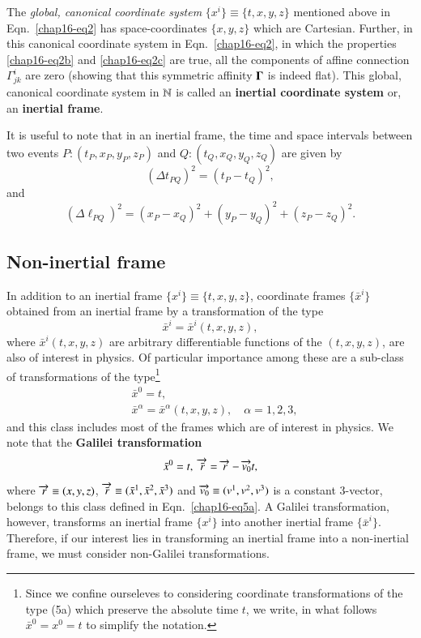 The \textsl{global, canonical coordinate system} $\{x^i\}\equiv\{t, x,y,z\} $ mentioned above in Eqn.~\eqref{chap16-eq2} has space-coordinates $\{x,y,z\}$ which are Cartesian. Further, in this canonical coordinate system in Eqn.~\eqref{chap16-eq2}, in which the properties \eqref{chap16-eq2b} and \eqref{chap16-eq2c} are true, all the components of affine connection $\Gamma^i_{jk}$ are zero (showing that this  symmetric affinity $\mathbf{\Gamma}$ is indeed flat). This global, canonical coordinate system in $\mathbb{N}$ is called an \textbf{inertial coordinate system} or, an \textbf{inertial frame}. 

It is useful to note that in an inertial frame, the time and space intervals between two events $P:(t_P,x_P,y_P,z_P)$ and $Q:(t_Q,x_Q,y_Q,z_Q)$  are given by
\begin{equation}
(\Delta  t_{PQ})^2=(t_P-t_Q)^2,\label{chap16-eq3}
\end{equation}
and 
\begin{equation}
(\Delta  \ell_{PQ})^2=(x_P-x_Q)^2+(y_P-y_Q)^2+(z_P-z_Q)^2.\label{chap16-eq4}
\end{equation}

\subsection{Non-inertial frame}\label{chap16-sec2.2}

In addition to an inertial frame $\{x^i\}\equiv\{t,x,y,z\}$, coordinate frames  $\{\bar{x}^i\}$ obtained from an inertial frame by a transformation of the type 
\begin{equation}
\bar{x}^i=\bar{x}^i(t, x,y,z),\label{chap16-eq5}
\end{equation}
where $\bar{x}^i (t, x,y,z)$ are arbitrary differentiable functions of the $(t, x,y,z)$,  are also of interest in physics. Of particular importance among these are a sub-class of transformations of the type\footnote{Since we confine ourseleves to considering coordinate transformations of the type (5a) which preserve the absolute time $t$, we write, in what follows $\bar{x}^0=x^0=t$ to simplify the notation.} 
\begin{align*}
& \bar{x}^0= t,\\
& \bar{x}^\alpha=\bar{x}^\alpha(t, x,y,z),\quad \alpha=1,2,3,\tag{5a}\label{chap16-eq5a}
\end{align*}
and this class includes most of the  frames which are of interest in physics. We note that the \textbf{Galilei transformation} 
\begin{equation}
 \bar{x}^0=t,\;\overrightarrow{\bar{r}} =\overrightarrow{r}-\overrightarrow{v_0}t ,\label{chap16-eq6}
\end{equation}
where $\overrightarrow{{r}}\equiv  (x,y,z)$, $\overrightarrow{\bar{r}}\equiv  (\bar{x}^1,\bar{x}^2,\bar{x}^3)$ and $\overrightarrow{v_0}\equiv  (v^1,v^2,v^3)$ is a constant 3-vector, belongs to this class defined in Eqn.~\eqref{chap16-eq5a}. A Galilei transformation, however,  transforms an  inertial frame $\{x^i\}$ into another inertial frame $\{\bar{x}^i\}$. Therefore, if our interest lies in transforming an inertial frame into a non-inertial frame, we must consider non-Galilei transformations. 

